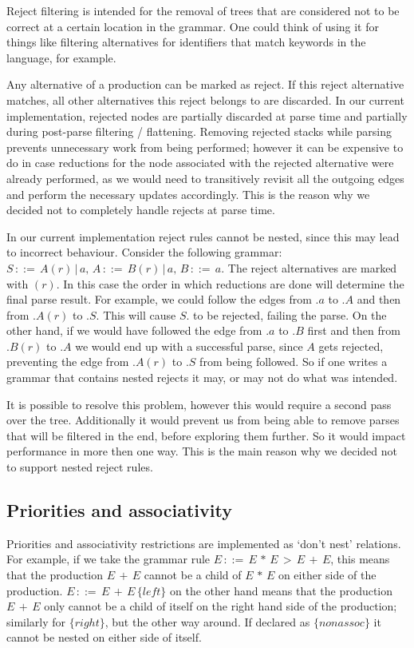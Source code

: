 \documentclass[a4paper,10pt]{article}
\begin{document}
Reject filtering is intended for the removal of trees that are considered not to be correct at a certain location in the grammar. One could think of using it for things like filtering alternatives for identifiers that match keywords in the language, for example.

Any alternative of a production can be marked as reject. If this reject alternative matches, all other alternatives this reject belongs to are discarded. In our current implementation, rejected nodes are partially discarded at parse time and partially during post-parse filtering / flattening. Removing rejected stacks while parsing prevents unnecessary work from being performed; however it can be expensive to do in case reductions for the node associated with the rejected alternative were already performed, as we would need to transitively revisit all the outgoing edges and perform the necessary updates accordingly. This is the reason why we decided not to completely handle rejects at parse time.

In our current implementation reject rules cannot be nested, since this may lead to incorrect behaviour. Consider the following grammar: $S\,::=\,A(r)\,|\,a,\,A\,::=\,B(r)\,|\,a,\,B\,::=\,a$. The reject alternatives are marked with $(r)$. In this case the order in which reductions are done will determine the final parse result. For example, we could follow the edges from $.a$ to $.A$ and then from $.A(r)$ to $.S$. This will cause $S.$ to be rejected, failing the parse. On the other hand, if we would have followed the edge from $.a$ to $.B$ first and then from $.B(r)$ to $.A$ we would end up with a successful parse, since $A$ gets rejected, preventing the edge from $.A(r)$ to $.S$ from being followed. So if one writes a grammar that contains nested rejects it may, or may not do what was intended.

It is possible to resolve this problem, however this would require a second pass over the tree. Additionally it would prevent us from being able to remove parses that will be filtered in the end, before exploring them further. So it would impact performance in more then one way. This is the main reason why we decided not to support nested reject rules.

\subsection{Priorities and associativity}

Priorities and associativity restrictions are implemented as `don't nest' relations. For example, if we take the grammar rule $E\,::=\,E\,*\,E\,>\,E\,+\,E$, this means that the production $E\,+\,E$ cannot be a child of $E\,*\,E$ on either side of the production. $E\,::=\,E\,+\,E\,\{left\}$ on the other hand means that the production $E\,+\,E$ only cannot be a child of itself on the right hand side of the production; similarly for $\{right\}$, but the other way around. If declared as $\{nonassoc\}$ it cannot be nested on either side of itself.
\end{document}
